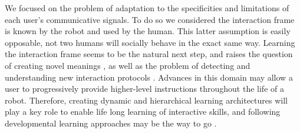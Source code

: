 We focused on the problem of adaptation to the specificities and limitations of each user's communicative signals. To do so we considered the interaction frame is known by the robot and used by the human. This latter assumption is easily opposable, not two humans will socially behave in the exact same way. Learning the interaction frame seems to be the natural next step, and raises the question of creating novel meanings \cite{steels2002aibos}, as well as the problem of detecting and understanding new interaction protocols \cite{mohammad2010learning,macl11simul}. Advances in this domain may allow a user to progressively provide higher-level instructions throughout the life of a robot. Therefore, creating dynamic and hierarchical learning architectures will play a key role to enable life long learning of interactive skills, and following developmental learning approaches may be the way to go \cite{lungarella2003developmental,demiris2005motor,lopes2007developmental}.










